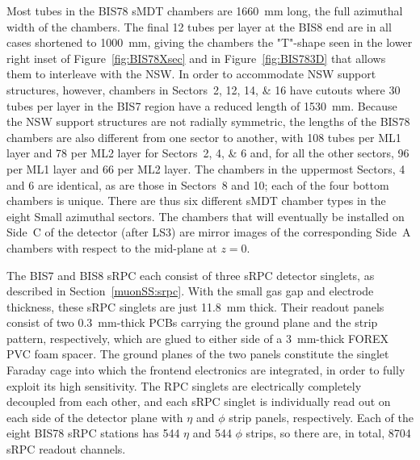 \documentclass[cernpreprint, atlasdraft=false, UKenglish,british,orcidlogo, texmf, orcidlogo]{atlasdoc}
\begin{document}
Most tubes in the BIS78 \gls{sMDT} chambers are \SI{1660}{\mm} long, the full azimuthal width of the chambers. The final \num{12} tubes per layer at the BIS8 end are in all cases shortened to \SI{1000}{\mm}, giving the chambers the "T"-shape seen in the lower right inset of Figure~\ref{fig:BIS78Xsec} and in Figure~\ref{fig:BIS783D} that allows them to interleave with the \gls{NSW}.
In order to accommodate \gls{NSW} support structures, however, chambers in Sectors~\numlist{2;12;14;16} have cutouts where \num{30} tubes per layer in the BIS7 region have a reduced length of \SI{1530}{\mm}.
Because the \gls{NSW} support structures are not radially symmetric, the lengths of the BIS78 chambers are also different from one sector to another, with \num{108} tubes per ML1 layer and \num{78} per ML2 layer for Sectors~\numlist{2;4;6} and, for all the other sectors, \num{96} per ML1 layer and \num{66} per ML2 layer.
The chambers in the uppermost Sectors, 4 and 6 are identical, as are those in Sectors~8 and 10; each of the four bottom chambers is unique.
There are thus six different \gls{sMDT} chamber types in the eight Small azimuthal sectors.
The chambers that will eventually be installed on Side~C of the detector (after \gls{LS3}) are mirror images of the corresponding Side~A chambers with respect to the mid-plane at $z=0$.
 
The BIS7 and BIS8 \gls{sRPC} each consist of three \gls{sRPC} detector singlets, as described in Section~\ref{muonSS:srpc}.
With the small gas gap and electrode thickness, these \gls{sRPC} singlets are just \SI{11.8}{\mm} thick.
Their readout panels consist of two \SI{0.3}{\mm}-thick \glspl{PCB} carrying the ground plane and the strip pattern, respectively, which are
glued to either side of a \SI{3}{\mm}-thick FOREX\textsuperscript{\textregistered} \gls{PVC} foam spacer.
The ground planes of the two panels constitute the singlet Faraday cage into which the frontend electronics are integrated, in order to fully exploit its high sensitivity.
The \gls{RPC} singlets are electrically completely decoupled from each other, and each \gls{sRPC} singlet is individually read out on each side of the detector plane with $\eta$ and $\phi$ strip panels, respectively.
Each of the eight \gls{BIS78} \gls{sRPC} stations has \num{544} $\eta$ and \num{544} $\phi$ strips,
so there are, in total, \num{8704} \gls{sRPC} readout channels.
 
\end{document}

